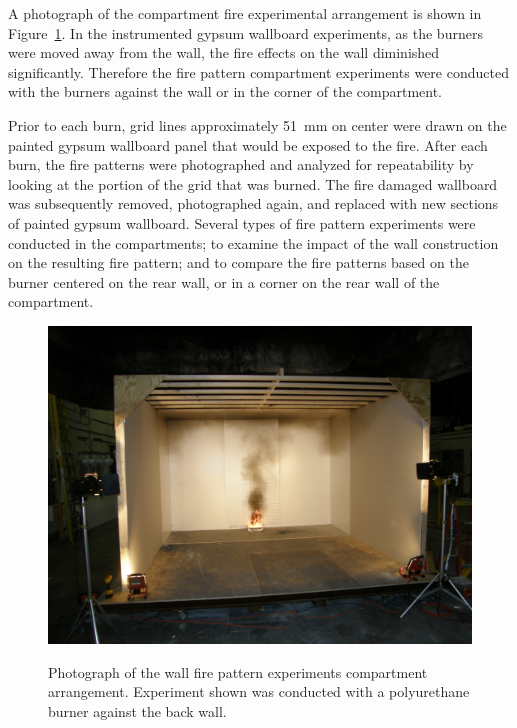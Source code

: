 \documentclass[twoside]{uocthesis}
\begin{document}
{A photograph of the compartment fire experimental arrangement is shown in Figure~\ref{Compartment_Test}. In the instrumented gypsum wallboard experiments, as the burners were moved away from the wall, the fire effects on the wall diminished significantly.  Therefore the fire pattern compartment experiments were conducted with the burners against the wall or in the corner of the compartment.

Prior to each burn, grid lines approximately 51~mm on center were drawn on the painted gypsum wallboard panel that would be exposed to the fire.  After each burn, the fire patterns were photographed and analyzed for repeatability by looking at the portion of the grid that was burned. The fire damaged wallboard was subsequently removed, photographed again, and replaced with new sections of painted gypsum wallboard. Several types of fire pattern experiments were conducted in the compartments; to examine the impact of the wall construction on the resulting fire pattern; and to compare the fire patterns based on the burner centered on the rear wall, or in a corner on the rear wall of the compartment.

\begin{figure}[ht!]
\includegraphics[width=\columnwidth]{../Figures/Compartment_Test} \\
	\caption[Photograph of the wall fire pattern experiments compartment arrangement]{Photograph of the wall fire pattern experiments compartment arrangement.  Experiment shown was conducted with a polyurethane burner against the back wall.}
	\label{Compartment_Test}
\end{figure}

}
\end{document}
